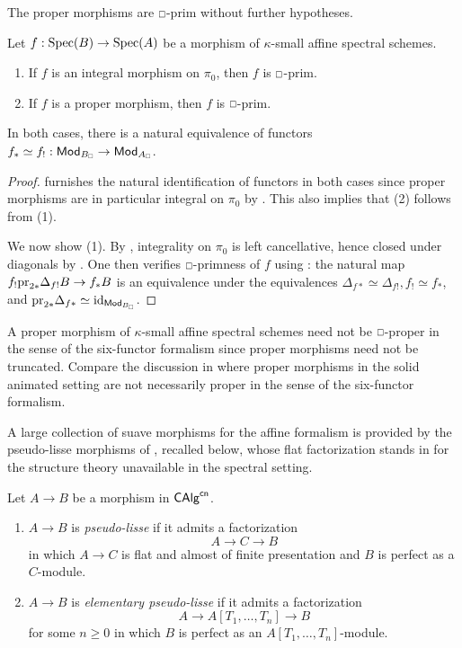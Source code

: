 The proper morphisms are $\msld$-prim without further hypotheses.
\begin{lemma}\label{lem: proper morphisms of affines}
    Let $f:\operatorname{Spec}(B)\to\operatorname{Spec}(A)$ be a morphism of $\kappa$-small affine spectral schemes.
    \begin{enumerate}
        \item If $f$ is an integral morphism on $\pi_{0}$, then $f$ is $\msld$-prim. 
        \item If $f$ is a proper morphism, then $f$ is $\msld$-prim. 
    \end{enumerate}
    In both cases, there is a natural equivalence of functors $f_{*}\simeq f_{!}:\Mod_{B_{\sld}}\to\Mod_{A_{\sld}}$. 
\end{lemma}
\begin{proof}
     furnishes the natural identification of functors in both cases since proper morphisms are in particular integral on $\pi_{0}$ by \cite[Prop. 5.2.1.1]{SAG}. This also implies that (2) follows from (1). 

    We now show (1). By \cite[\href{https://stacks.math.columbia.edu/tag/02JM}{Tag 02JM}]{stacks-project}, integrality on $\pi_{0}$ is left cancellative, hence closed under diagonals by \cite[Lem. 2.1.5]{HeyerMann6FF}. One then verifies $\msld$-primness of $f$ using \cite[Lem. 4.5.5]{HeyerMann6FF}: the natural map $f_{!}\mathrm{pr}_{2*}\Delta_{f!}B\to f_{*}B$ is an equivalence under the equivalences $\Delta_{f*}\simeq\Delta_{f!}, f_{!}\simeq f_{*}$, and $\pr_{2*}\Delta_{f*}\simeq\id_{\Mod_{B_{\sld}}}$. 
\end{proof}
\begin{remark}\label{rmk: primness and properness}
    A proper morphism of $\kappa$-small affine spectral schemes need not be $\msld$-proper in the sense of the six-functor formalism since proper morphisms need not be truncated. Compare the discussion in \cite[Def. 2.7.11]{HansenMannCLL} where proper morphisms in the solid animated setting are not necessarily proper in the sense of the six-functor formalism. 
\end{remark}
A large collection of suave morphisms for the affine formalism is provided by the pseudo-lisse morphisms of , recalled below, whose flat factorization stands in for the structure theory unavailable in the spectral setting.
\begin{definition}\label{def: pseudo-lisse body}
    Let $A\to B$ be a morphism in $\mathsf{CAlg}^{\mathsf{cn}}$.
    \begin{enumerate}
        \item $A\to B$ is \emph{pseudo-lisse} if it admits a factorization
        $$A\to C\to B$$
        in which $A\to C$ is flat and almost of finite presentation and $B$ is perfect as a $C$-module.
        \item $A\to B$ is \emph{elementary pseudo-lisse} if it admits a factorization
        $$A\to A[T_{1},\dots,T_{n}]\to B$$
        for some $n\geq0$ in which $B$ is perfect as an $A[T_{1},\dots,T_{n}]$-module.
    \end{enumerate}
\end{definition}
